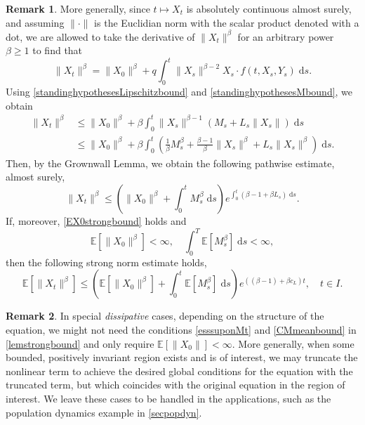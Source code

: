 \documentclass[reqno,12pt]{amsart}
\theoremstyle{plain} %
\theoremstyle{definition} %
\newtheorem{remark}{Remark}[section]
\begin{document}
\begin{remark}
    More generally, since $t\mapsto X_t$ is absolutely continuous almost surely, and assuming $\|\cdot\|$ is the Euclidian norm with the scalar product denoted with a dot, we are allowed to take the derivative of $\|X_t\|^\beta$ for an arbitrary power $\beta \geq 1$ to find that
    \[
        \|X_t\|^\beta = \|X_0\|^\beta + q\int_0^t \|X_s\|^{\beta-2}X_s \cdot f(t, X_s, Y_s)\;\mathrm{d}s.
    \]
    Using \eqref{standinghypothesesLipschitzbound} and \eqref{standinghypothesesMbound}, we obtain
    \begin{align*}
        \|X_t\|^\beta & \leq \|X_0\|^\beta + \beta\int_0^t \|X_s\|^{\beta-1} \left(M_s + L_s \|X_s\|\right)\;\mathrm{d}s \\
        & \leq \|X_0\|^\beta + \beta\int_0^t \left(\frac{1}{\beta}M_s^\beta + \frac{\beta-1}{\beta}\|X_s\|^\beta + L_s \|X_s\|^\beta\right)\;\mathrm{d}s.
    \end{align*}
    Then, by the Grownwall Lemma, we obtain the following pathwise estimate, almost surely,
    \begin{equation}
        \label{XtboundLXMtbeta}
        \|X_t\|^\beta \leq \left(\|X_0\|^\beta + \int_0^t M_s^\beta \;\mathrm{d}s\right) e^{\int_0^t \left(\beta - 1 + \beta L_s\right) \;\mathrm{d}s}.
    \end{equation}
    If, moreover, \eqref{EX0strongbound} holds and 
    \begin{equation}
        \label{EX0Mtstrongboundbeta}
        \mathbb{E}[\|X_0\|^\beta] < \infty, \quad
        \int_0^T \mathbb{E}[M_s^\beta] \;\mathrm{d}s < \infty,
    \end{equation}
    then the following strong norm estimate holds,
    \begin{equation}
        \label{EXtstrongboundbeta}
        \mathbb{E}[\|X_t\|^\beta] \leq \left(\mathbb{E}[\|X_0\|^\beta] + \int_0^t \mathbb{E}[M_s^\beta]\;\mathrm{d}s\right) e^{((\beta - 1) + \beta c_L) t}, \quad t\in I.
    \end{equation}
\end{remark}

\begin{remark}
    In special \emph{dissipative} cases, depending on the structure of the equation, we might not need the conditions \eqref{esssuponMt} and \eqref{CMmeanbound} in \cref{lemstrongbound} and only require $\mathbb{E}[\|X_0\|] < \infty$. More generally, when some bounded, positively invariant region exists and is of interest, we may truncate the nonlinear term to achieve the desired global conditions for the equation with the truncated term, but which coincides with the original equation in the region of interest. We leave these cases to be handled in the applications, such as the population dynamics example in \cref{secpopdyn}.
\end{remark}
\end{document}
